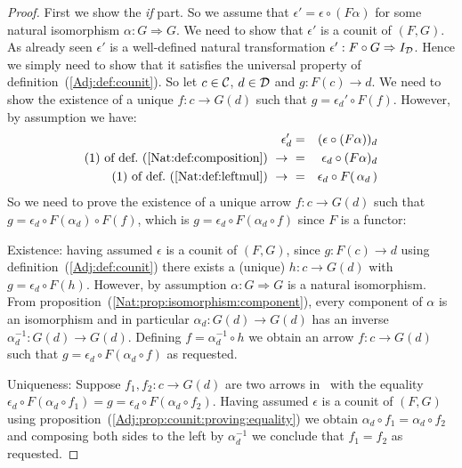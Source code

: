 \noindent
\begin{proof}
    First we show the {\em if} part. So we assume that $\epsilon'=\epsilon
    \circ(F\alpha)$ for some natural isomorphism $\alpha:G\Rightarrow G$. We 
    need to show that $\epsilon'$ is a counit of $(F,G)$. As already seen
    $\epsilon'$ is a well-defined natural transformation $\epsilon':F\circ 
    G\Rightarrow I_{\cal D}$. Hence we simply need to show that it satisfies 
    the universal property of definition~(\ref{Adj:def:counit}). So let 
    $c\in\mbox{$\cal C$}$, $d\in\mbox{$\cal D$}$ and $g:F(c)\to d$. We need to show the existence 
    of a unique $f:c\to G(d)$ such that $g = \epsilon_{d}'\circ F(f)$. However, 
    by assumption we have:
        \begin{eqnarray*}\epsilon'_{d}
            &=&(\epsilon\circ(F\alpha))_{d}\\
            \mbox{$(1)$ of def.~(\ref{Nat:def:composition})}\ \to\ 
            &=&\epsilon_{d}\circ(F\alpha)_{d}\\
            \mbox{$(1)$ of def.~(\ref{Nat:def:leftmul})}\ \to\ 
            &=&\epsilon_{d}\circ F(\,\alpha_{d}\,)\\
        \end{eqnarray*}
    So we need to prove the existence of a unique arrow $f:c\to G(d)$
    such that $g = \epsilon_{d}\circ F(\alpha_{d})\circ F(f)$, which is
     $g = \epsilon_{d}\circ F(\alpha_{d}\circ f)$ since $F$ is a functor:

    Existence: having assumed $\epsilon$ is a counit of $(F,G)$, since 
    $g:F(c)\to d$ using definition~(\ref{Adj:def:counit}) there exists
    a (unique) $h:c\to G(d)$ with $g = \epsilon_{d}\circ F(h)$. However, 
    by assumption $\alpha:G\Rightarrow G$ is a natural isomorphism. 
    From proposition~(\ref{Nat:prop:isomorphism:component}),
    every component of $\alpha$ is an isomorphism and in particular
    $\alpha_{d}:G(d)\to G(d)$ has an inverse $\alpha_{d}^{-1}:G(d)\to G(d)$.
    Defining $f=\alpha_{d}^{-1}\circ h$ we obtain an arrow $f:c\to G(d)$ such
    that $g=\epsilon_{d}\circ F(\alpha_{d}\circ f)$ as requested.

    Uniqueness: Suppose $f_{1},f_{2}:c\to G(d)$ are two arrows in \Cat\ 
    with the equality $\epsilon_{d}\circ F(\alpha_{d}\circ f_{1})=g=
    \epsilon_{d}\circ F(\alpha_{d}\circ f_{2})$. Having assumed 
    $\epsilon$ is a counit of $(F,G)$ using
    proposition~(\ref{Adj:prop:counit:proving:equality}) we obtain 
    $\alpha_{d}\circ f_{1}=\alpha_{d}\circ f_{2}$ and composing both sides
    to the left by $\alpha_{d}^{-1}$ we conclude that $f_{1}=f_{2}$
    as requested.


\end{proof}
